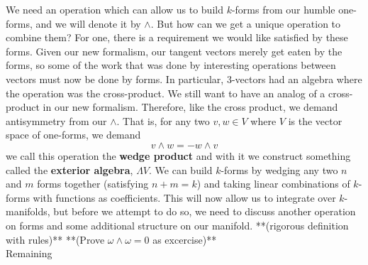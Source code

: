  We need an operation which can allow us to build $k$-forms from our humble one-forms, and we will denote it by $\wedge$.  But how can we get a unique operation to combine them?  For one, there is a requirement we would like satisfied by these forms.  Given our new formalism, our tangent vectors merely get eaten by the forms, so some of the work that was done by interesting operations between vectors must now be done by forms.  In particular, 3-vectors had an algebra where the operation was the cross-product.  We still want to have an analog of a cross-product in our new formalism. Therefore, like the cross product, we demand antisymmetry from our $\wedge$.  That is, for any two $v, w \in V$ where $V$ is the vector space of one-forms, we demand 
 \begin{equation*}
 	v \wedge w = -w \wedge v
 \end{equation*} 
we call this operation the \textbf{wedge product} and with it we construct something called the \textbf{exterior algebra}, $\Lambda V$.  We can build $k$-forms by wedging any two $n$ and $m$ forms together (satisfying $n+m = k$) and taking linear combinations of $k$-forms with functions as coefficients.  This will now allow us to integrate over $k$-manifolds, but before we attempt to do so, we need to discuss another operation on forms and some additional structure on our manifold.   **(rigorous definition with rules)** **(Prove $\omega \wedge \omega = 0$ as excercise)**\\
Remaining\\

